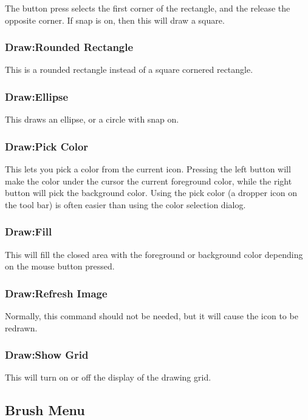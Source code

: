 The button press selects the first corner of the rectangle,
and the release the opposite corner. If snap is on,
then this will draw a square.

\subsubsection* {Draw:Rounded Rectangle}

This is a rounded rectangle instead of a square cornered
rectangle.

\subsubsection* {Draw:Ellipse}

This draws an ellipse, or a circle with snap on.

\subsubsection* {Draw:Pick Color}

This lets you pick a color from the current icon. Pressing
the left button will make the color under the cursor
the current foreground color, while the right button
will pick the background color. Using the pick color
(a dropper icon on the tool bar) is often easier than
using the color selection dialog.

\subsubsection* {Draw:Fill}

This will fill the closed area with the foreground or
background color depending on the mouse button pressed.

\subsubsection* {Draw:Refresh Image}

Normally, this command should not be needed, but it will
cause the icon to be redrawn.

\subsubsection* {Draw:Show Grid}

This will turn on or off the display of the drawing grid.

\subsection {Brush Menu}

